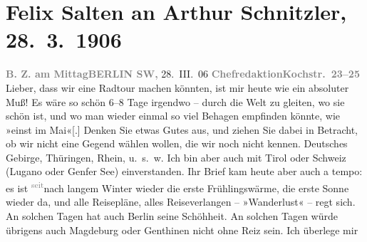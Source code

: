                \section[Felix Salten an Arthur Schnitzler, 28. 3. 1906]{ Felix Salten an Arthur Schnitzler, 28. 3. 1906}\nopagebreak{}\rehead{ }\begin{ledgroupsized}[t]{13cm}\normalsize\beginnumbering \toendnotes[C]{\smallbreak\pagebreak[2]} 
\toendnotes[C]{\smallbreak}\pstart
           \noindent{}{\pb}\textcolor{gray}{\textbf{B. Z. am Mittag}}\hfill \textcolor{gray}{\textbf{BERLIN SW,}}{ }28. III. 06\pend
           \pstart
           \textcolor{gray}{\textbf{Chefredaktion}}\hfill \textcolor{gray}{\textbf{Kochstr. 23–25}}\pend
           \pstart
           Lieber, dass wir eine Radtour machen könnten, ist mir heute wie ein
               absoluter Muß! Es wäre so schön 6–8 Tage irgendwo – durch die Welt zu gleiten, wo sie
               schön ist, und wo man wieder einmal so viel Behagen empfinden könnte, wie »einst im
                  Mai«{[}.{]} Denken Sie etwas Gutes aus, und ziehen Sie dabei in
               Betracht, ob wir nicht eine Gegend wählen wollen, die wir noch nicht kennen.
               Deutsches Gebirge, Thüringen, Rhein, u. s. w. Ich bin aber auch mit Tirol oder Schweiz (Lugano oder Genfer See) einverstanden. Ihr Brief kam heute aber auch a
               tempo: es ist \substVorne{}\textsuperscript{\textcolor{gray}{seit}}\substDazwischen{}nach\substHinten{} langem Winter wieder die erste Frühlingswärme, die erste Sonne wieder da,
               und alle Reisepläne, alles Reiseverlangen – »Wanderlust« – regt sich. An solchen
               Tagen hat auch Berlin seine Schöhheit. An solchen
               Tagen würde übrigens auch Magdeburg oder Genthinen nicht ohne Reiz sein. Ich überlege mir

\end{ledgroupsized}
